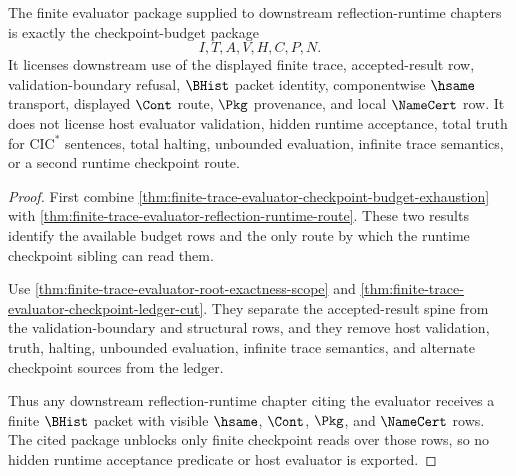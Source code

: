 \begin{theorem}
\label{thm:finite-trace-evaluator-downstream-unblock-scope}
The finite evaluator package supplied to downstream reflection-runtime
chapters is exactly the checkpoint-budget package
$$
I,T,A,V,H,C,P,N.
$$
It licenses downstream use of the displayed finite trace, accepted-result row,
validation-boundary refusal, $\BHist$ packet identity, componentwise $\hsame$
transport, displayed $\Cont$ route, $\Pkg$ provenance, and local $\NameCert$
row. It does not license host evaluator validation, hidden runtime acceptance,
total truth for $\mathrm{CIC}^{*}$ sentences, total halting, unbounded
evaluation, infinite trace semantics, or a second runtime checkpoint route.
\end{theorem}
\begin{proof}
First combine
\autoref{thm:finite-trace-evaluator-checkpoint-budget-exhaustion} with
\autoref{thm:finite-trace-evaluator-reflection-runtime-route}. These two
results identify the available budget rows and the only route by which the
runtime checkpoint sibling can read them.

Use \autoref{thm:finite-trace-evaluator-root-exactness-scope} and
\autoref{thm:finite-trace-evaluator-checkpoint-ledger-cut}. They separate the
accepted-result spine from the validation-boundary and structural rows, and
they remove host validation, truth, halting, unbounded evaluation, infinite
trace semantics, and alternate checkpoint sources from the ledger.

Thus any downstream reflection-runtime chapter citing the evaluator receives a
finite $\BHist$ packet with visible $\hsame$, $\Cont$, $\Pkg$, and $\NameCert$
rows. The cited package unblocks only finite checkpoint reads over those rows,
so no hidden runtime acceptance predicate or host evaluator is exported.
\end{proof}
